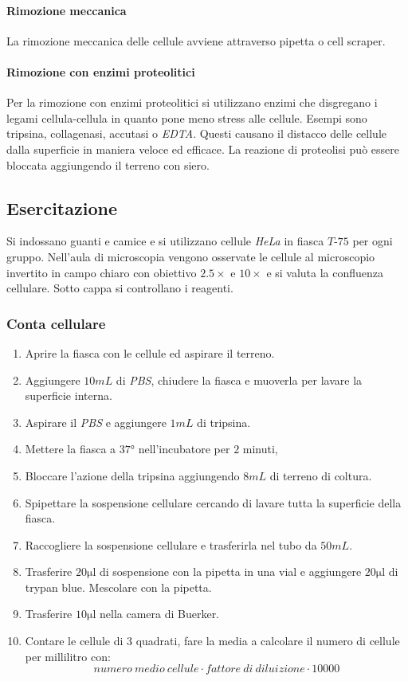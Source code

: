 			\paragraph{Rimozione meccanica}
			La rimozione meccanica delle cellule avviene attraverso pipetta o cell scraper.

			\paragraph{Rimozione con enzimi proteolitici}
			Per la rimozione con enzimi proteolitici si utilizzano enzimi che disgregano i legami cellula-cellula in quanto pone meno stress alle cellule.
			Esempi sono tripsina, collagenasi, accutasi o \emph{EDTA}.
			Questi causano il distacco delle cellule dalla superficie in maniera veloce ed efficace.
			La reazione di proteolisi pu\`o essere bloccata aggiungendo il terreno con siero.

	\subsection{Esercitazione}
	Si indossano guanti e camice e si utilizzano cellule \emph{HeLa} in fiasca $T$-$75$ per ogni gruppo.
	Nell'aula di microscopia vengono osservate le cellule al microscopio invertito in campo chiaro con obiettivo $2.5\times$ e $10\times$ e si valuta la confluenza cellulare.
	Sotto cappa si controllano i reagenti. 
		
		\subsubsection{Conta cellulare}
		\begin{enumerate}
			\item Aprire la fiasca con le cellule ed aspirare il terreno.
			\item Aggiungere $10\si{mL}$ di \emph{PBS}, chiudere la fiasca e muoverla per lavare la superficie interna.
			\item Aspirare il \emph{PBS} e aggiungere $1\si{mL}$ di tripsina.
			\item Mettere la fiasca a $37\si{\degree}$ nell'incubatore per $2$ minuti,
			\item Bloccare l'azione della tripsina aggiungendo $8\si{mL}$ di terreno di coltura.
			\item Spipettare la sospensione cellulare cercando di lavare tutta la superficie della fiasca.
			\item Raccogliere la sospensione cellulare e trasferirla nel tubo da $50\si{mL}$.
			\item Trasferire $20\si{\micro\litre}$ di sospensione con la pipetta in una vial e aggiungere $20\si{\micro\litre}$ di trypan blue. 
				Mescolare con la pipetta.
			\item Trasferire $10\si{\micro\litre}$ nella camera di Buerker.
			\item Contare le cellule di $3$ quadrati, fare la media a calcolare il numero di cellule per millilitro con:
				\[numero\ medio\ cellule \cdot fattore\ di\ diluizione \cdot \num{10000}\]
		\end{enumerate}
			
